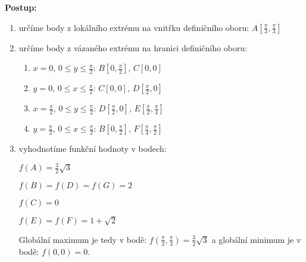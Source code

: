 \begin{enumerate}
\textbf{Postup:}
\begin{enumerate}
\item určíme body  z lokálního extrému na vnitřku definičního oboru:
$A[\frac{\pi}{3},\frac{\pi}{3}]$
\item určíme body  z vázaného extrému na hranici definičního oboru:
  \begin{enumerate}
  \item $x=0$, $0 \leq y \leq \frac{\pi}{2}$:
        $B[0,\frac{\pi}{2}]$,
        $C[0,0]$
  \item $y=0$, $0 \leq x \leq \frac{\pi}{2}$:
        $C[0,0]$,
        $D[\frac{\pi}{2},0]$  
  \item $x=\frac{\pi}{2}$, $0 \leq y \leq \frac{\pi}{2}$:
        $D[\frac{\pi}{2},0]$,
        $E[\frac{\pi}{2},\frac{\pi}{4}]$
  \item $y=\frac{\pi}{2}$, $0 \leq x \leq \frac{\pi}{2}$:
        $B[0,\frac{\pi}{2}]$,
        $F[\frac{\pi}{4},\frac{\pi}{2}]$
  \end{enumerate}
\item vyhodnotíme funkční hodnoty v  bodech:

$f(A) = \frac{3}{2} \sqrt{3}$

$f(B) = f(D) = f(G) = 2$

$f(C) = 0$

$f(E) = f(F) = 1 + \sqrt{2}$

Globální maximum je tedy v bodě: 
$f(\frac{\pi}{3},\frac{\pi}{3}) = \frac{3}{2} \sqrt{3}$
a globální minimum je v bodě: 
$f(0,0) = 0$.
\end{enumerate}


\end{enumerate}